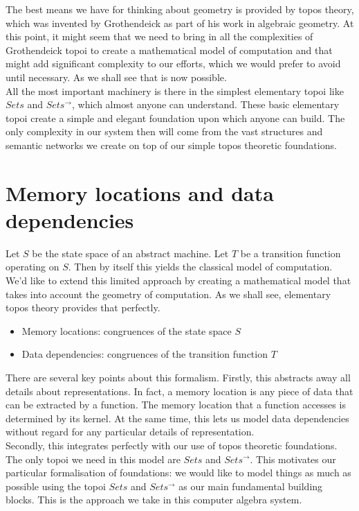 \documentclass[a4paper,11pt]{report}
\begin{document}
The best means we have for thinking about geometry is provided by topos theory, which was invented by Grothendeick as part of his work in algebraic geometry. At this point, it might seem that we need to bring in all the complexities of Grothendeick topoi to create a mathematical model of computation and that might add significant complexity to our efforts, which we would prefer to avoid until necessary. As we shall see that is now possible. \\

All the most important machinery is there in the simplest elementary topoi like $Sets$ and $Sets^{\to}$, which almost anyone can understand. These basic elementary topoi create a simple and elegant foundation upon which anyone can build. The only complexity in our system then will come from the vast structures and semantic networks we create on top of our simple topos theoretic foundations.

\newpage 

\section{Memory locations and data dependencies}


Let $S$ be the state space of an abstract machine. Let $T$ be a transition function operating on $S$. Then by itself this yields the classical model of computation. We'd like to extend this limited approach by creating a mathematical model that takes into account the geometry of computation. As we shall see, elementary topos theory provides that perfectly.

\begin{itemize}
  \item Memory locations: congruences of the state space $S$
  \item Data dependencies: congruences of the transition function $T$
\end{itemize}

There are several key points about this formalism. Firstly, this abstracts away all details about representations. In fact, a memory location is any piece of data that can be extracted by a function. The memory location that a function accesses is determined by its kernel. At the same time, this lets us model data dependencies without regard for any particular details of representation. \\

Secondly, this integrates perfectly with our use of topos theoretic foundations. The only topoi we need in this model are $Sets$ and $Sets^{\to}$. This motivates our particular formalisation of foundations: we would like to model things as much as possible using the topoi $Sets$ and $Sets^{\to}$ as our main fundamental building blocks. This is the approach we take in this computer algebra system. \\
\end{document}
